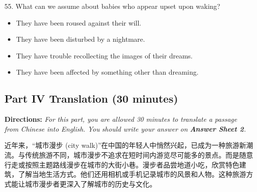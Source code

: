 \documentclass[UTF8,11pt]{ctexart}
\begin{document}
55. What can we assume about babies who appear upset upon waking?


\begin{itemize}[leftmargin=2em,itemsep=.2em,topsep=.4em]\item[A.] They have been roused against their will.
\item[B.] They have been disturbed by a nightmare.
\item[C.] They have trouble recollecting the images of their dreams.
\item[D.] They have been affected by something other than dreaming.
\end{itemize}

\subsection*{\textbf{Part IV Translation (30 minutes)}}


\textbf{Directions: }\textit{For this part, you are allowed 30 minutes to translate a passage from Chinese into English. You} \textit{should write your answer on }\textbf{\textit{Answer Sheet 2}}\textit{.}


近年来，“城市漫步 (city walk)”在中国的年轻人中悄然兴起，已成为一种旅游新潮流。与传统旅游不同，城市漫步不追求在短时间内游览尽可能多的景点。而是随意行走或按照主题路线漫步在城市的大街小巷。漫步者品尝地道小吃，欣赏特色建筑，了解当地生活方式。他们还用相机或手机记录城市的风景和人物。这种旅游方式能让城市漫步者更深入了解城市的历史与文化。
\end{document}
